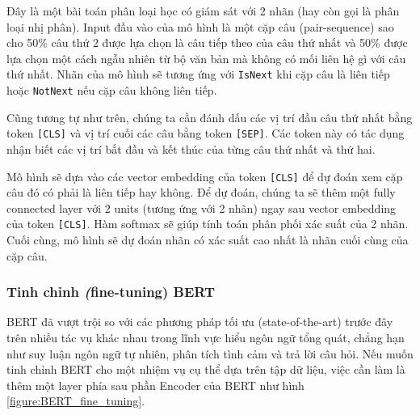 \begin{enumerate}
          Đây là một bài toán phân loại học có giám sát với 2 nhãn (hay còn gọi là phân loại nhị phân). Input đầu vào của mô hình là một cặp câu (pair-sequence) sao cho 50\% câu thứ 2 được lựa chọn là câu tiếp theo của câu thứ nhất và 50\% được lựa chọn một cách ngẫu nhiên từ bộ văn bản mà không có mối liên hệ gì với câu thứ nhất. Nhãn của mô hình sẽ tương ứng với {\tt {\small IsNext}} khi cặp câu là liên tiếp hoặc {\tt {\small NotNext}} nếu cặp câu không liên tiếp.

          Cũng tương tự như trên, chúng ta cần đánh dấu các vị trí đầu câu thứ nhất bằng token {\tt [CLS]} và vị trí cuối các câu bằng token {\tt [SEP]}. Các token này có tác dụng nhận biết các vị trí bắt đầu và kết thúc của từng câu thứ nhất và thứ hai.

          Mô hình sẽ dựa vào các vector embedding của token {\tt [CLS]} để dự đoán xem cặp câu đó có phải là liên tiếp hay không. Để dự đoán, chúng ta sẽ thêm một fully connected layer với 2 units (tương ứng với 2 nhãn) ngay sau vector embedding của token {\tt [CLS]}. Hàm softmax sẽ giúp tính toán phân phối xác suất của 2 nhãn. Cuối cùng, mô hình sẽ dự đoán nhãn có xác suất cao nhất là nhãn cuối cùng của cặp câu.
\end{enumerate}

\subsubsection{Tinh chỉnh \textit(fine-tuning) BERT}

BERT đã vượt trội so với các phương pháp tối ưu (state-of-the-art) trước đây trên nhiều tác vụ khác nhau trong lĩnh vực hiểu ngôn ngữ tổng quát, chẳng hạn như suy luận ngôn ngữ tự nhiên, phân tích tình cảm và trả lời câu hỏi.
Nếu muốn tinh chỉnh BERT cho một nhiệm vụ cụ thể dựa trên tập dữ liệu, việc cần làm là thêm một layer phía sau phần Encoder của BERT như hình \ref{figure:BERT_fine_tuning}.

